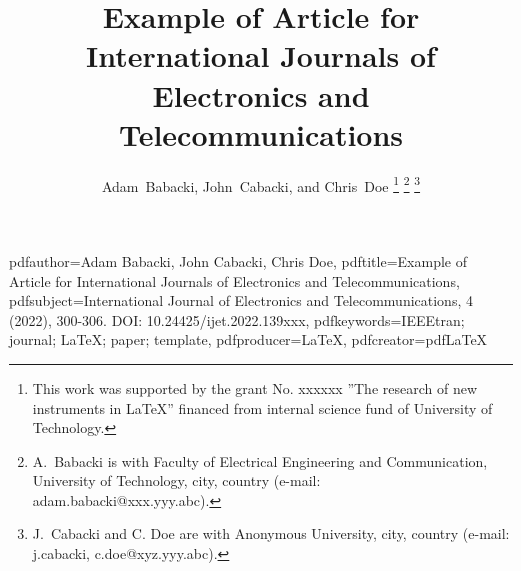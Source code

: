 

\hypersetup
{pdfauthor={Adam Babacki, John Cabacki, Chris Doe},%
pdftitle={Example of Article for International Journals of Electronics and Telecommunications},%
pdfsubject={International Journal of Electronics and Telecommunications, 4 (2022), 300-306. DOI: 10.24425/ijet.2022.139xxx},%
pdfkeywords={IEEEtran; journal; LaTeX; paper; template},%
pdfproducer={LaTeX},%
pdfcreator={pdfLaTeX}
}


%

\title{\vspace{1cm} Example of Article for International Journals of Electronics and Telecommunications} %
%
%
%

\author{Adam~Babacki, John~Cabacki, and Chris~Doe%
	\thanks{This work was supported by the grant No. xxxxxx ”The research of new instruments in LaTeX” financed from internal science fund of University of Technology.}%
	\thanks{A.~Babacki is with Faculty of Electrical Engineering and Communication,  University of Technology, city, country (e-mail: adam.babacki@xxx.yyy.abc).}%
	\thanks{J.~Cabacki and C. Doe are with Anonymous University, city, country (e-mail: {j.cabacki, c.doe}@xyz.yyy.abc).}%
}



